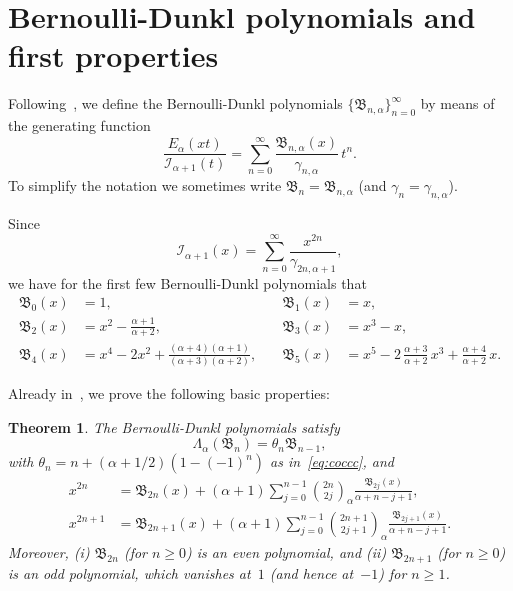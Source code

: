 \documentclass[10pt]{article}
\theoremstyle{plain}
\newtheorem{theorem}{Theorem}[section]
\theoremstyle{definition}
\numberwithin{equation}{section} %
\newcommand{\Ea}{E_{\alpha}}
\newcommand{\La}{\Lambda_{\alpha}}
\newcommand{\binoma}[2]{\binom{#1}{#2}_{\!\alpha}}
\newcommand{\I}{\mathcal{I}}
\newcommand{\B}{\mathfrak{B}}
\newcommand{\cc}{\gamma}
\begin{document}
\section{Bernoulli-Dunkl polynomials and first properties}
\label{sec:BD}

Following~\cite{CDPV}, we define the Bernoulli-Dunkl polynomials $\{\B_{n,\alpha}\}_{n=0}^{\infty}$ by means of the generating function
\begin{equation}
\label{eq:defbd}
  \frac{\Ea(xt)}{\I_{\alpha+1}(t)}
  = \sum_{n=0}^\infty \frac{\B_{n,\alpha}(x)}{\cc_{n,\alpha}}\,t^n.
\end{equation}
To simplify the notation we sometimes write $\B_n=\B_{n,\alpha}$ (and $\cc_n=\cc_{n,\alpha}$).

Since
\begin{equation*}
  \I_{\alpha+1}(x) = \sum_{n=0}^\infty \frac{x^{2n}}{\cc_{2n,\alpha+1}},
\end{equation*}
we have for the first few Bernoulli-Dunkl polynomials that
\begin{align*}
  \B_0(x) &= 1, \quad & \B_1(x) &= x, \\
  \B_2(x) &= x^2 - \frac{\alpha+1}{\alpha+2},\quad &
  \B_3(x) &= x^3 - x,\\
  \B_4(x) &= x^4 - 2x^2 + \frac{(\alpha+4)(\alpha+1)}{(\alpha+3)(\alpha+2)},\quad &
  \B_5(x) &= x^5 - 2\,\frac{\alpha+3}{\alpha+2}\,x^3 + \frac{\alpha+4}{\alpha+2}\,x.
\end{align*}

Already in~\cite{CDPV}, we prove the following basic properties:

\begin{theorem}
The Bernoulli-Dunkl polynomials satisfy 
\begin{equation}
\label{eq:LaBn}
\La(\B_n) = \theta_n \B_{n-1},
\end{equation}
with $\theta_n = n+(\alpha+1/2)(1-(-1)^n)$ as in~\eqref{eq:coccc}, and
\begin{align}
\label{eq:x2nbd}
x^{2n} &= \B_{2n}(x)+(\alpha+1) \sum_{j=0}^{n-1} \binoma{2n}{2j}
\frac{\B_{2j}(x)}{\alpha+n-j+1},\\
\label{eq:x2n1bd}
x^{2n+1} &= \B_{2n+1}(x) + (\alpha+1) \sum_{j=0}^{n-1} \binoma{2n+1}{2j+1}
\frac{\B_{2j+1}(x)}{\alpha+n-j+1}.
\end{align}
Moreover,
(i) $\B_{2n}$ (for $n\ge 0$) is an even polynomial, and
(ii) $\B_{2n+1}$ (for $n\ge 0$) is an odd polynomial, which vanishes at~$1$ (and hence at~$-1$) for $n\ge 1$.
\end{theorem}
\end{document}
